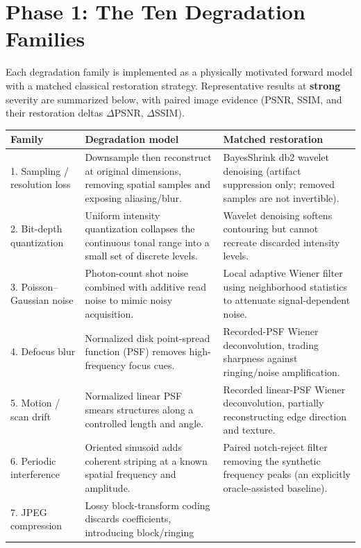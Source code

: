 \documentclass[11pt]{article}
\begin{document}
\section{Phase 1: The Ten Degradation Families}

Each degradation family is implemented as a physically motivated forward model with a
matched classical restoration strategy. Representative results at \textbf{strong}
severity are summarized below, with paired image evidence (PSNR, SSIM, and their
restoration deltas $\Delta$PSNR, $\Delta$SSIM).

\begin{table}[h]
\centering
\small
\begin{tabularx}{\linewidth}{@{}l X X@{}}
\toprule
\textbf{Family} & \textbf{Degradation model} & \textbf{Matched restoration} \\
\midrule
1. Sampling / resolution loss &
Downsample then reconstruct at original dimensions, removing spatial samples and
exposing aliasing/blur. &
BayesShrink db2 wavelet denoising (artifact suppression only; removed samples are not
invertible). \\
2. Bit-depth quantization &
Uniform intensity quantization collapses the continuous tonal range into a small set of
discrete levels. &
Wavelet denoising softens contouring but cannot recreate discarded intensity levels. \\
3. Poisson--Gaussian noise &
Photon-count shot noise combined with additive read noise to mimic noisy acquisition. &
Local adaptive Wiener filter using neighborhood statistics to attenuate signal-dependent
noise. \\
4. Defocus blur &
Normalized disk point-spread function (PSF) removes high-frequency focus cues. &
Recorded-PSF Wiener deconvolution, trading sharpness against ringing/noise
amplification. \\
5. Motion / scan drift &
Normalized linear PSF smears structures along a controlled length and angle. &
Recorded linear-PSF Wiener deconvolution, partially reconstructing edge direction and
texture. \\
6. Periodic interference &
Oriented sinusoid adds coherent striping at a known spatial frequency and amplitude. &
Paired notch-reject filter removing the synthetic frequency peaks (an explicitly
oracle-assisted baseline). \\
7. JPEG compression &
Lossy block-transform coding discards coefficients, introducing block/ringing

\end{tabularx}
\end{table}
\end{document}
